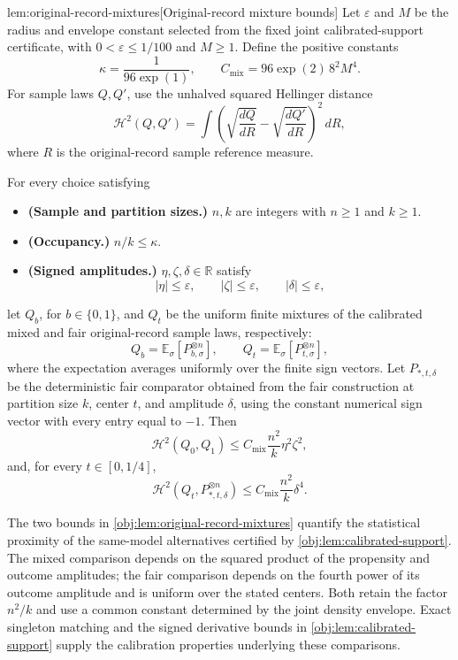\begin{lemmav}{lem:original-record-mixtures}[Original-record mixture bounds]
Let \(\varepsilon\) and \(M\) be the radius and envelope constant selected from the fixed joint calibrated-support certificate, with \(0<\varepsilon\le 1/100\) and \(M\ge 1\). Define the positive constants
\[
\kappa=\frac{1}{96\exp(1)},
\qquad
C_{\mathrm{mix}}=96\exp(2)\,8^2M^4.
\]
For sample laws \(Q,Q'\), use the unhalved squared Hellinger distance
\[
\mathcal H^2(Q,Q')
=
\int
\left(
\sqrt{\frac{dQ}{dR}}-
\sqrt{\frac{dQ'}{dR}}
\right)^2\,dR,
\]
where \(R\) is the original-record sample reference measure.

For every choice satisfying
\begin{itemize}
\item \textbf{(Sample and partition sizes.)} \(n,k\) are integers with \(n\ge 1\) and \(k\ge 1\).
\item \textbf{(Occupancy.)} \(n/k\le\kappa\).
\item \textbf{(Signed amplitudes.)} \(\eta,\zeta,\delta\in\mathbb R\) satisfy
\[
|\eta|\le\varepsilon,\qquad
|\zeta|\le\varepsilon,\qquad
|\delta|\le\varepsilon,
\]
\end{itemize}
let \(Q_b\), for \(b\in\{0,1\}\), and \(Q_t\) be the uniform finite mixtures of the calibrated mixed and fair original-record sample laws, respectively:
\[
Q_b=\mathbb E_\sigma\!\left[P_{b,\sigma}^{\otimes n}\right],
\qquad
Q_t=\mathbb E_\sigma\!\left[P_{t,\sigma}^{\otimes n}\right],
\]
where the expectation averages uniformly over the finite sign vectors. Let \(P_{*,t,\delta}\) be the deterministic fair comparator obtained from the fair construction at partition size \(k\), center \(t\), and amplitude \(\delta\), using the constant numerical sign vector with every entry equal to \( -1 \). Then
\[
\mathcal H^2(Q_0,Q_1)
\le
C_{\mathrm{mix}}\frac{n^2}{k}\eta^2\zeta^2,
\]
and, for every \(t\in[0,1/4]\),
\[
\mathcal H^2\!\left(Q_t,P_{*,t,\delta}^{\otimes n}\right)
\le
C_{\mathrm{mix}}\frac{n^2}{k}\delta^4.
\]
\end{lemmav}

The two bounds in \cref{obj:lem:original-record-mixtures} quantify the statistical proximity of the same-model alternatives certified by \cref{obj:lem:calibrated-support}. The mixed comparison depends on the squared product of the propensity and outcome amplitudes; the fair comparison depends on the fourth power of its outcome amplitude and is uniform over the stated centers. Both retain the factor \(n^2/k\) and use a common constant determined by the joint density envelope. Exact singleton matching and the signed derivative bounds in \cref{obj:lem:calibrated-support} supply the calibration properties underlying these comparisons.

